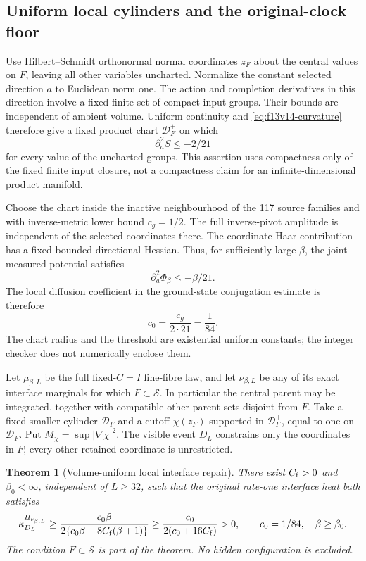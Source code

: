 \documentclass[11pt,oneside]{article}
\newtheorem{theorem}{Theorem}[section]
\begin{document}
\subsection{Uniform local cylinders and the original-clock floor}

Use Hilbert--Schmidt orthonormal normal
coordinates \(z_F\) about the central
values on \(F\), leaving all other
variables uncharted. Normalize the
constant selected direction \(a\) to
Euclidean norm one. The action and
completion derivatives in this direction
involve a fixed finite set of compact
input groups. Their bounds are independent
of ambient volume. Uniform continuity
and \eqref{eq:f13v14-curvature} therefore
give a fixed product chart
\(\mathcal D_F^+\) on which
\[
                      \partial_a^2S\le-2/21
\]
for every value of the uncharted groups.
This assertion uses compactness only
of the fixed finite input closure,
not a compactness claim for an
infinite-dimensional product manifold.

Choose the chart inside the inactive
neighbourhood of the 117 source families
and with inverse-metric lower bound
\(c_g=1/2\). The full inverse-pivot
amplitude is independent of the
selected coordinates there. The
coordinate-Haar contribution has a
fixed bounded directional Hessian.
Thus, for sufficiently large \(\beta\),
the joint measured potential satisfies
\[
                    \partial_a^2\Phi_\beta\le-\beta/21 .
\]
The local diffusion coefficient in the
ground-state conjugation estimate is
therefore
\[
                   c_0=\frac{c_g}{2\cdot21}=\frac1{84}.
\]
The chart radius and the threshold are
existential uniform constants; the
integer checker does not numerically
enclose them.

Let \(\mu_{\beta,L}\) be the full
fixed-\(C=I\) fine-fibre law, and let
\(\nu_{\beta,L}\) be any of its exact
interface marginals for which
\(F\subset\mathcal S\). In particular
the central parent may be integrated,
together with compatible other parent
sets disjoint from \(F\). Take a fixed
smaller cylinder \(\mathcal D_F\) and
a cutoff \(\chi(z_F)\) supported in
\(\mathcal D_F^+\), equal to one on
\(\mathcal D_F\). Put
\(M_\chi=\sup|\nabla\chi|^2\).
The visible event \(D_L\) constrains
only the coordinates in \(F\); every
other retained coordinate is unrestricted.

\begin{theorem}[Volume-uniform local interface repair]
\label{thm:f13v14-floor}
There exist \(C_{\rm f}>0\) and
\(\beta_0<\infty\), independent of
\(L\ge32\), such that the original
rate-one interface heat bath satisfies
\begin{equation}\label{eq:f13v14-floor}
 \kappa_{D_L}^{H_{\nu_{\beta,L}}}
 \ge\frac{c_0\beta}
        {2\{c_0\beta+8C_{\rm f}(\beta+1)\}}
 \ge\frac{c_0}{2(c_0+16C_{\rm f})}>0,
           \qquad c_0=1/84,\quad \beta\ge\beta_0 .
\end{equation}
The condition \(F\subset\mathcal S\)
is part of the theorem. No hidden
configuration is excluded.
\end{theorem}
\end{document}
